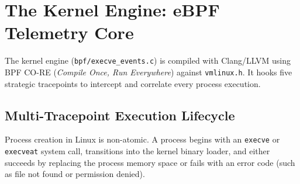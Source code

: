 \documentclass[11pt,a4paper]{article}
\begin{document}
\newpage


\section{The Kernel Engine: eBPF Telemetry Core}

The kernel engine (\texttt{bpf/execve\_events.c}) is compiled with Clang/LLVM using BPF CO-RE (\textit{Compile Once, Run Everywhere}) against \texttt{vmlinux.h}. It hooks five strategic tracepoints to intercept and correlate every process execution.

\subsection{Multi-Tracepoint Execution Lifecycle}
Process creation in Linux is non-atomic. A process begins with an \texttt{execve} or \texttt{execveat} system call, transitions into the kernel binary loader, and either succeeds by replacing the process memory space or fails with an error code (such as file not found or permission denied).
\end{document}
